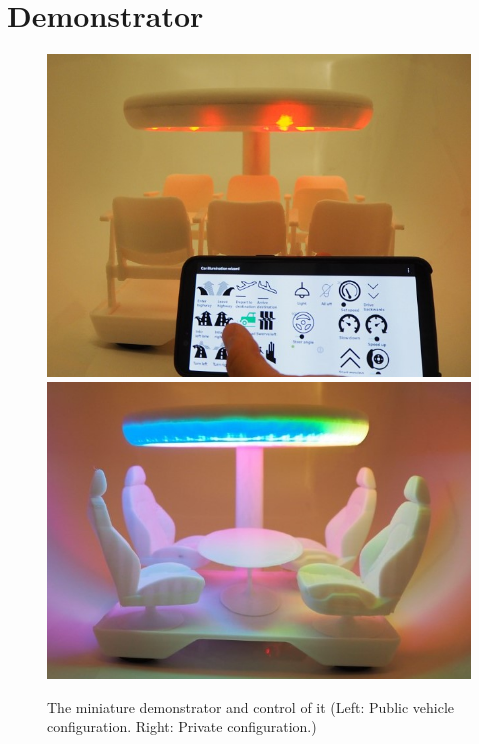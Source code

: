 \section{Demonstrator}

\begin{figure}
     \includegraphics[width=\textwidth]{fig/public.JPG}\hfill\includegraphics[width=\textwidth]{fig/private.JPG}
    \caption[Desktop Demonstrator]{The miniature demonstrator and control of it (Left:  Public vehicle configuration. Right: Private configuration.)}
    \label{fig:demonstrator}
\end{figure}
